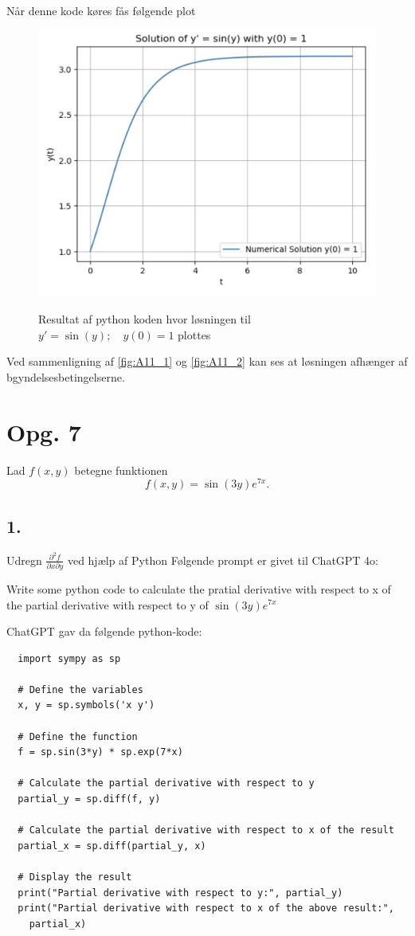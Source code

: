\documentclass[12pt]{article}
\theoremstyle{definition}
\begin{document}
Når denne kode køres fås følgende plot

\newpage

\begin{figure} [ht]
  \centering
  \caption{Resultat af python koden hvor løsningen til $y' = \sin(y); \quad y(0) = 1$ plottes}
  \includegraphics[width=0.8\linewidth]{../figures/A11_2.png}
  \label{fig:A11_2}
\end{figure}

Ved sammenligning af \autoref{fig:A11_1} og \autoref{fig:A11_2} kan ses at løsningen afhænger af bgyndelsesbetingelserne.


\section*{Opg. 7}
Lad $f(x,y)$ betegne funktionen
\[ 
f(x,y) = \sin(3y) e^{7x}
.\]

\subsection*{1.}
Udregn $\frac{\partial^2 f}{\partial x \partial y}$ ved hjælp af Python
\bigbreak
Følgende prompt er givet til ChatGPT 4o: 

\begin{blueline}
  Write some python code to calculate the pratial derivative with respect to x of the partial derivative with respect to y of $\sin(3y)e^{7x}$
\end{blueline}

ChatGPT gav da følgende python-kode:
\begin{verbatim}
  import sympy as sp

  # Define the variables
  x, y = sp.symbols('x y')

  # Define the function
  f = sp.sin(3*y) * sp.exp(7*x)

  # Calculate the partial derivative with respect to y
  partial_y = sp.diff(f, y)

  # Calculate the partial derivative with respect to x of the result
  partial_x = sp.diff(partial_y, x)

  # Display the result
  print("Partial derivative with respect to y:", partial_y)
  print("Partial derivative with respect to x of the above result:",
    partial_x)
\end{verbatim}
\end{document}
